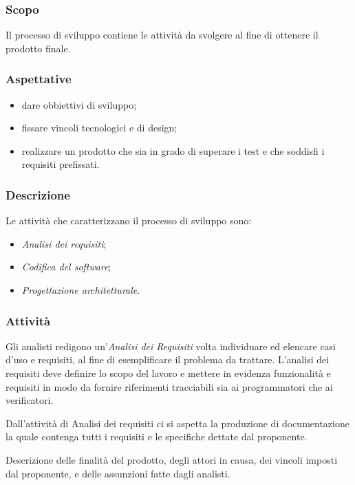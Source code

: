 		\subsubsection{Scopo}
		Il processo di sviluppo contiene le attività da svolgere al fine di ottenere il prodotto finale.
		
		\subsubsection{Aspettative}
		\begin{itemize}
			\item dare obbiettivi di sviluppo;
			\item fissare vincoli tecnologici e di design;
			\item realizzare un prodotto che sia in grado di superare i test e che soddisfi i requisiti prefissati.
		\end{itemize}
		
		\subsubsection{Descrizione}
		Le attività che caratterizzano il processo di sviluppo sono:
		\begin{itemize}
			\item \textit{Analisi dei requisiti};
			\item \textit{Codifica del software};
			\item \textit{Progettazione architetturale}.
		\end{itemize}
		
		\subsubsection{Attività}
		Gli analisti redigono un'\textit{Analisi dei Requisiti} volta  individuare ed elencare casi d'uso e requisiti, al fine di esemplificare il problema da trattare.
		L'analisi dei requisiti deve definire lo scopo del lavoro e mettere in evidenza funzionalità e requisiti in modo da fornire riferimenti tracciabili sia ai programmatori che ai verificatori.
		
		Dall'attività di Analisi dei requisiti ci si aspetta la produzione di documentazione la quale contenga tutti i requisiti e le specifiche dettate dal proponente.
	
		Descrizione delle finalità del prodotto, degli attori in causa, dei vincoli imposti dal proponente, e delle assunzioni fatte dagli analisti.
		
